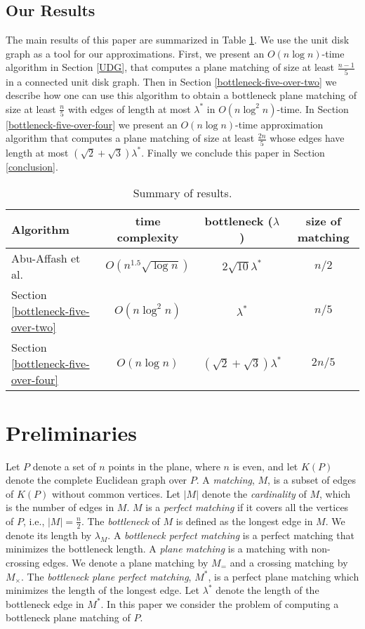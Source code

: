 \documentclass[11pt,a4paper]{article}
\newcommand{\MOPT}{M^*}
\newcommand{\bt}{\lambda}
\newcommand{\btopt}{\lambda^*}
\begin{document}
\subsection{Our Results}

The main results of this paper are summarized in Table \ref{table1}. We use the unit disk graph as a tool for our approximations. First, we present an $O(n\log n)$-time algorithm in Section \ref{UDG}, that computes a plane matching of size at least $\frac{n-1}{5}$ in a connected unit disk graph. Then in Section \ref{bottleneck-five-over-two} we describe how one can use this algorithm to obtain a bottleneck plane matching of size at least $\frac{n}{5}$ with edges of length at most $\btopt$ in $O(n\log^2 n)$-time.
In Section \ref{bottleneck-five-over-four} we present an $O(n\log n)$-time approximation algorithm that computes a plane matching of size at least $\frac{2n}{5}$ whose edges have length at most $(\sqrt{2}+\sqrt{3})\btopt$. Finally we conclude this paper in Section \ref{conclusion}.

\begin{table}
\centering
\caption{Summary of results.}
\label{table1}
    \begin{tabular}{|l|c|c|c|}
         \hline
             Algorithm &time complexity&bottleneck ($\bt$)    & size of matching  \\ \hline
             Abu-Affash et al. \cite{Abu-Affash2014}&$O(n^{1.5}\sqrt{\log n})$  & $2\sqrt{10}\btopt$ & $n/2$ \\
             Section \ref{bottleneck-five-over-two} &$O(n \log^2 n)$& $\btopt$ & $n/5$ \\
             Section \ref{bottleneck-five-over-four}&$O(n\log n)$ & $(\sqrt{2}+\sqrt{3})\btopt$ & $2n/5$\\
         \hline
    \end{tabular}
\end{table}

\section{Preliminaries}
\label{preliminaries}

Let $P$ denote a set of $n$ points in the plane, where $n$ is even, and let $K(P)$ denote the complete Euclidean graph over $P$. A {\em matching}, $M$, is a subset of edges of $K(P)$ without common vertices. Let $|M|$ denote the {\em cardinality} of $M$, which is the number of edges in $M$. $M$ is a {\em perfect matching} if it covers all the vertices of $P$, i.e., $|M|=\frac{n}{2}$. The {\em bottleneck} of $M$ is defined as the longest edge in $M$. We denote its length by $\bt_M$. A {\em bottleneck perfect matching} is a perfect matching that minimizes the bottleneck length. A {\em plane matching} is a matching with non-crossing edges. 
We denote a plane matching by $M_=$ and a crossing matching by $M_\times$. 
The {\em bottleneck plane perfect matching}, $\MOPT$, is a perfect plane matching which minimizes the length of the longest edge. Let $\btopt$ denote the length of the bottleneck edge in $\MOPT$. In this paper we consider the problem of computing a bottleneck plane matching of $P$. 
\end{document}

